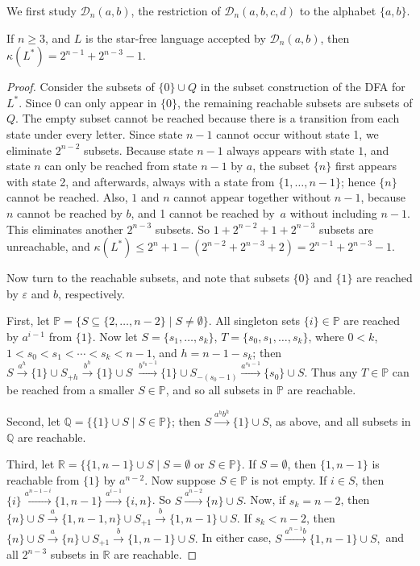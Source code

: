 \documentclass{llncs}
\renewcommand{\le}{\leqslant}
\renewcommand{\ge}{\geqslant}
\newcommand{\eps}{\varepsilon}
\newcommand{\emp}{\emptyset}
\newcommand{\cD}{{\mathcal D}}
\begin{document}
We first study  $\cD_n(a,b)$, the restriction of $\cD_n(a,b,c,d)$ to the alphabet $\{a,b\}$.
\begin{lemma}
\label{lem:star}
If $n\ge 3$, and $L$ is the  star-free language accepted by $\cD_n(a,b)$, then 
$\kappa(L^*)=2^{n-1}+2^{n-3}-1$. 
\end{lemma}
\begin{proof}
Consider the subsets of $\{0\}\cup Q$ in the subset construction of the DFA for $L^*$. Since 0 can only appear in $\{0\}$, the remaining reachable subsets are subsets of $Q$. 
The empty subset cannot be reached because there is a transition from each state under every letter. Since state $n-1$ cannot occur without state 1, we eliminate $2^{n-2}$ subsets.
Because state $n-1$ always appears with state $1$, and state $n$ can only be reached from state $n-1$ by $a$, the subset $\{n\}$ first appears with state 2, and afterwards, always with a state from $\{1,\ldots,n-1\}$; hence $\{n\}$ cannot be reached.
Also,   $1$ and $n$ cannot appear together without $n-1$, because  $n$ cannot be reached by $b$, and  1 cannot be reached by~$a$ without including $n-1$. This eliminates another $2^{n-3}$ subsets.
So $1+2^{n-2}+1+ 2^{n-3}$ subsets are unreachable, and $\kappa(L^*)\le 2^{n}+1- (2^{n-2}+2^{n-3}+2)=2^{n-1}+2^{n-3}-1$.

Now turn to the reachable subsets, and note that subsets $\{0\}$ and $\{1\}$ are reached by $\eps$ and $b$, respectively.

First, let $\mathbb{P}=\{S\subseteq \{2,\ldots,n-2\}\mid S\neq\emp\}$. 
 All singleton sets $\{i\}\in \mathbb{P} $ are reached by $a^{i-1}$ from $\{1\}$. 
 Now let  $S=\{s_1,\ldots,s_k\}$,
$T=\{s_0,s_1,\ldots,s_k\}$, where $0< k$,\;  $1< s_0< s_1<\cdots<s_k<n-1$, and 
$h=n-1-s_k$; then
$S \stackrel{a^{h}}{\rightarrow} \{1\}\cup S_{+h}
 \stackrel{b^{h}}{\rightarrow} \{1\}\cup S\;
 \stackrel{b^{s_0-1}}{\rightarrow} \{1\} \cup S_{-(s_0-1)}
\stackrel{a^{s_0-1}}{\rightarrow} \{s_0\} \cup S.
$
Thus any $T\in \mathbb{P}$ can be reached from a smaller $S\in \mathbb{P}$, and so all subsets in $\mathbb{P}$ are reachable.

Second, let $\mathbb{Q}=\{ \{1\}\cup S\mid S\in \mathbb{P} \}$; then 
$S \stackrel{a^hb^{h}}{\rightarrow} \{1\}\cup S$, as above,
and all  subsets in $\mathbb{Q}$ are reachable.

Third, let $\mathbb{R}=\{\{1,n-1\}\cup S \mid S=\emp  \text{ or } S\in \mathbb{P}\}$. 
If $S=\emp$, then $ \{1,n-1\}$ is reachable from $\{1\}$ by $a^{n-2}$. 
 Now suppose $S\in \mathbb{P}$ is not empty.
 If $i\in S$, then $\{i\}\stackrel{a^{n-1-i}}{\rightarrow} \{1,n-1\} \stackrel{a^{i-1}}{\rightarrow} \{i,n\}$. 
 So  $S\stackrel{a^{n-2}}{\rightarrow}  \{n\}\cup S$.
Now, if $s_k=n-2$, then 
$\{n\}\cup S \stackrel{a}{\rightarrow}    \{1, n-1,n\}\cup S_{+1} \stackrel{b}{\rightarrow}  \{1, n-1\}\cup S.$
If $s_k<n-2$, then 
$\{n\}\cup S \stackrel{a}{\rightarrow} \{n\}\cup S_{+1} 
 \stackrel{b}{\rightarrow}  \{1, n-1\}\cup S.$
In either case, 
$
S\stackrel{a^{n-1}b}{\rightarrow} \{1,n-1\}\cup S , 
$
and all $2^{n-3}$ subsets in $\mathbb{R}$ are reachable.


\end{proof}
\end{document}
